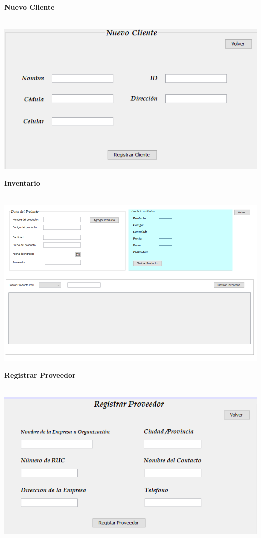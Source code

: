 \documentclass[12pt,a4paper]{article}
\begin{document}
 \par\vspace{0.5cm}
\textbf {Nuevo Cliente}\\\\
\begin{center}
 \includegraphics[scale=0.7]{nuevocliente.png} 
 \end{center}
 \par\vspace{2cm}
\textbf {Inventario}\\\\
\begin{center}
 \includegraphics[scale=0.7]{inventario.png} 
 \end{center}
 \par\vspace{0.5cm}
\textbf {Registrar Proveedor}\\\\
\begin{center}
 \includegraphics[scale=0.7]{registroprove.png} 
 \end{center}
\end{document}
